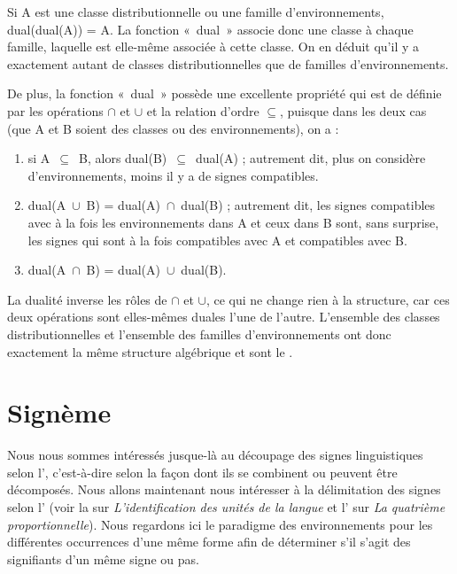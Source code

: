 {    Si A est une classe distributionnelle ou une famille d’environnements, dual(dual(A)) = A. La fonction «~dual~» associe donc une classe à chaque famille, laquelle est elle-même associée à cette classe. On en déduit qu’il y a exactement autant de classes distributionnelles que de familles d’environnements.

    De plus, la fonction «~dual~» possède une excellente propriété qui est de  définie par les opérations \textrm{${\cap}$} et \textrm{${\cup}$} et la relation d’ordre \textrm{${\subseteq}$}, puisque dans les deux cas (que A et B soient des classes ou des environnements), on a :

    \begin{enumerate}
    \item  si A~\textrm{${\subseteq}$}~B, alors dual(B)~\textrm{${\subseteq}$}~dual(A) ; autrement dit, plus on considère d’environnements, moins il y a de signes compatibles.
    \item  dual(A~\textrm{${\cup}$}~B) = dual(A)~\textrm{${\cap}$}~dual(B) ; autrement dit, les signes compatibles avec à la fois les environnements dans A et ceux dans B sont, sans surprise, les signes qui sont à la fois compatibles avec A et compatibles avec B.
    \item dual(A~\textrm{${\cap}$}~B) = dual(A)~\textrm{${\cup}$}~dual(B).
    \end{enumerate}

    La dualité inverse les rôles de \textrm{${\cap}$} et \textrm{${\cup}$}, ce qui ne change rien à la structure, car ces deux opérations sont elles-mêmes duales l’une de l’autre. L’ensemble des classes distributionnelles et l’ensemble des familles d'environnements ont donc exactement la même structure algébrique et sont le  .
}
\section{Signème}\label{sec:2.2.9}

Nous nous sommes intéressés jusque-là au découpage des signes linguistiques selon l’, c’est-à-dire selon la façon dont ils se combinent ou peuvent être décomposés. Nous allons maintenant nous intéresser à la délimitation des signes selon l’ (voir la  sur \textit{L’identification des unités de la langue} et l’ sur \textit{La quatrième proportionnelle}). Nous regardons ici le paradigme des environnements pour les différentes occurrences d’une même forme afin de déterminer s’il s’agit des signifiants d’un même signe ou pas.


